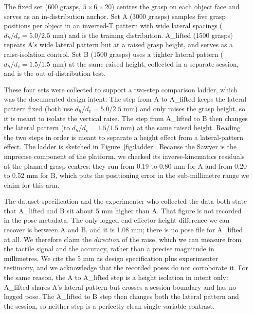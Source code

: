 \documentclass[journal]{IEEEtran}
\begin{document}
The fixed set (600 grasps, $5\times6\times20$) centres the grasp on each object face and serves as an in-distribution anchor. Set A (3000 grasps) samples five grasp positions per object in an inverted-T pattern with wide lateral spacings ($d_h/d_v = 5.0/2.5$ mm) and is the training distribution. A\_lifted (1500 grasps) repeats A's wide lateral pattern but at a raised grasp height, and serves as a raise-isolation control. Set B (1500 grasps) uses a tighter lateral pattern ($d_h/d_v = 1.5/1.5$ mm) at the same raised height, collected in a separate session, and is the out-of-distribution test.

These four sets were collected to support a two-step comparison ladder, which was the documented design intent. The step from A to A\_lifted keeps the lateral pattern fixed (both use $d_h/d_v = 5.0/2.5$ mm) and only raises the grasp height, so it is meant to isolate the vertical raise. The step from A\_lifted to B then changes the lateral pattern (to $d_h/d_v = 1.5/1.5$ mm) at the same raised height. Reading the two steps in order is meant to separate a height effect from a lateral-pattern effect. The ladder is sketched in Figure~\ref{fig:ladder}. Because the Sawyer is the imprecise component of the platform, we checked its inverse-kinematics residuals at the planned grasp centres: they run from 0.19 to 0.80 mm for A and from 0.20 to 0.52 mm for B, which puts the positioning error in the sub-millimetre range we claim for this arm.


The dataset specification and the experimenter who collected the data both state that A\_lifted and B sit about 5 mm higher than A. That figure is not recorded in the pose metadata. The only logged end-effector height difference we can recover is between A and B, and it is 1.08 mm; there is no pose file for A\_lifted at all. We therefore claim the \emph{direction} of the raise, which we can measure from the tactile signal and the accuracy, rather than a precise magnitude in millimetres. We cite the 5 mm as design specification plus experimenter testimony, and we acknowledge that the recorded poses do not corroborate it. For the same reason, the A to A\_lifted step is a height isolation in intent only: A\_lifted shares A's lateral pattern but crosses a session boundary and has no logged pose. The A\_lifted to B step then changes both the lateral pattern and the session, so neither step is a perfectly clean single-variable contrast.
\end{document}
